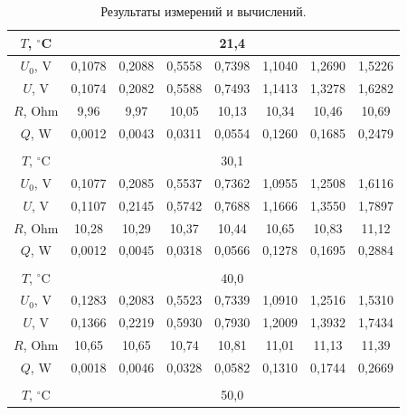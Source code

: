 \documentclass[a4paper,12pt]{article} %
\begin{document}
\begin{enumerate}
\newpage
{}	
\begin{table}[h!]
\centering
\caption{Результаты измерений и вычислений.}
\label{table:results_1}
\begin{tabular}{|c|c|c|c|c|c|c|c|}
\hline
$T$, $^\circ$C   & \multicolumn{7}{c|}{21,4}                                           \\ \hline
$U_0$, V   & 0,1078  & 0,2088  & 0,5558  & 0,7398  & 1,1040  & 1,2690  & 1,5226  \\ \hline
$U$, V   & 0,1074  & 0,2082  & 0,5588  & 0,7493  & 1,1413  & 1,3278  & 1,6282  \\ \hline
$R$, Ohm & 9,96  & 9,97  & 10,05 & 10,13 & 10,34 & 10,46 & 10,69 \\ \hline
$Q$, W    & 0,0012  & 0,0043  & 0,0311  & 0,0554  & 0,1260  & 0,1685  & 0,2479  \\ \hline
\multicolumn{8}{|c|}{}                                                        \\ \hline
$T$, $^\circ$C   & \multicolumn{7}{c|}{30,1}                                           \\ \hline
$U_0$, V   & 0,1077  & 0,2085  & 0,5537  & 0,7362  & 1,0955  & 1,2508  & 1,6116  \\ \hline
$U$, V   & 0,1107  & 0,2145  & 0,5742  & 0,7688  & 1,1666  & 1,3550  & 1,7897  \\ \hline
$R$, Ohm & 10,28 & 10,29 & 10,37 & 10,44 & 10,65 & 10,83 & 11,12 \\ \hline
$Q$, W    & 0,0012  & 0,0045  & 0,0318  & 0,0566  & 0,1278  & 0,1695  & 0,2884  \\ \hline
\multicolumn{8}{|c|}{}                                                        \\ \hline
$T$, $^\circ$C   & \multicolumn{7}{c|}{40,0}                                           \\ \hline
$U_0$, V   & 0,1283  & 0,2083  & 0,5523  & 0,7339  & 1,0910  & 1,2516  & 1,5310  \\ \hline
$U$, V   & 0,1366  & 0,2219  & 0,5930  & 0,7930  & 1,2009  & 1,3932  & 1,7434  \\ \hline
$R$, Ohm & 10,65 & 10,65 & 10,74 & 10,81 & 11,01 & 11,13 & 11,39 \\ \hline
$Q$, W    & 0,0018  & 0,0046  & 0,0328  & 0,0582  & 0,1310  & 0,1744  & 0,2669  \\ \hline
\multicolumn{8}{|c|}{}                                                        \\ \hline
$T$, $^\circ$C   & \multicolumn{7}{c|}{50,0}                                           \\ \hline

\end{tabular}
\end{table}
\end{enumerate}
\end{document}

